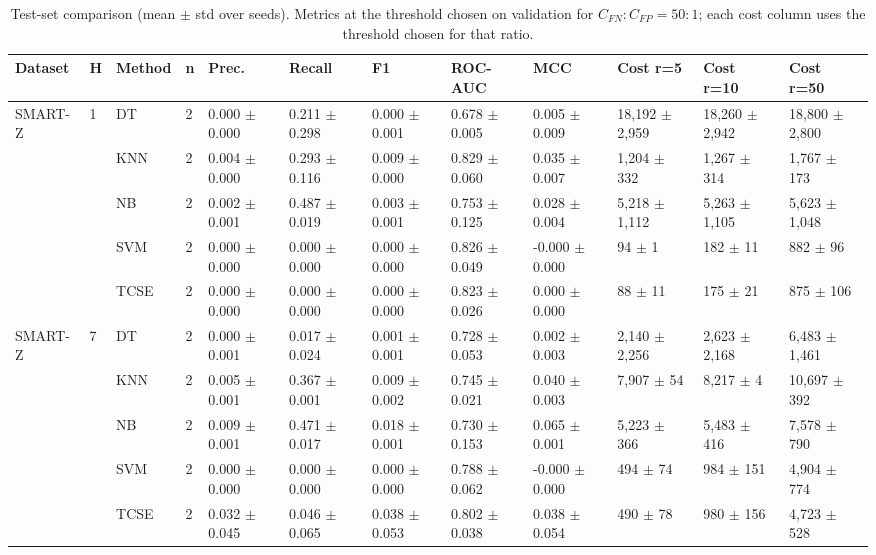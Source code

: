 \begin{table}[t]
\centering
\caption{Test-set comparison (mean $\pm$ std over seeds). Metrics at the threshold chosen on validation for $C_{FN}{:}C_{FP}=50{:}1$; each cost column uses the threshold chosen for that ratio.}
\label{tab:table1_main_comparison_r50}
\footnotesize
\begin{tabular}{llllllllllll}
\toprule
Dataset & H & Method & n & Prec. & Recall & F1 & ROC-AUC & MCC & Cost r=5 & Cost r=10 & Cost r=50 \\
\midrule
SMART-Z & 1 & DT & 2 & 0.000 $\pm$ 0.000 & 0.211 $\pm$ 0.298 & 0.000 $\pm$ 0.001 & 0.678 $\pm$ 0.005 & 0.005 $\pm$ 0.009 & 18,192 $\pm$ 2,959 & 18,260 $\pm$ 2,942 & 18,800 $\pm$ 2,800 \\
 &  & KNN & 2 & 0.004 $\pm$ 0.000 & 0.293 $\pm$ 0.116 & 0.009 $\pm$ 0.000 & 0.829 $\pm$ 0.060 & 0.035 $\pm$ 0.007 & 1,204 $\pm$ 332 & 1,267 $\pm$ 314 & 1,767 $\pm$ 173 \\
 &  & NB & 2 & 0.002 $\pm$ 0.001 & 0.487 $\pm$ 0.019 & 0.003 $\pm$ 0.001 & 0.753 $\pm$ 0.125 & 0.028 $\pm$ 0.004 & 5,218 $\pm$ 1,112 & 5,263 $\pm$ 1,105 & 5,623 $\pm$ 1,048 \\
 &  & SVM & 2 & 0.000 $\pm$ 0.000 & 0.000 $\pm$ 0.000 & 0.000 $\pm$ 0.000 & 0.826 $\pm$ 0.049 & -0.000 $\pm$ 0.000 & 94 $\pm$ 1 & 182 $\pm$ 11 & 882 $\pm$ 96 \\
 &  & TCSE & 2 & 0.000 $\pm$ 0.000 & 0.000 $\pm$ 0.000 & 0.000 $\pm$ 0.000 & 0.823 $\pm$ 0.026 & 0.000 $\pm$ 0.000 & 88 $\pm$ 11 & 175 $\pm$ 21 & 875 $\pm$ 106 \\
SMART-Z & 7 & DT & 2 & 0.000 $\pm$ 0.001 & 0.017 $\pm$ 0.024 & 0.001 $\pm$ 0.001 & 0.728 $\pm$ 0.053 & 0.002 $\pm$ 0.003 & 2,140 $\pm$ 2,256 & 2,623 $\pm$ 2,168 & 6,483 $\pm$ 1,461 \\
 &  & KNN & 2 & 0.005 $\pm$ 0.001 & 0.367 $\pm$ 0.001 & 0.009 $\pm$ 0.002 & 0.745 $\pm$ 0.021 & 0.040 $\pm$ 0.003 & 7,907 $\pm$ 54 & 8,217 $\pm$ 4 & 10,697 $\pm$ 392 \\
 &  & NB & 2 & 0.009 $\pm$ 0.001 & 0.471 $\pm$ 0.017 & 0.018 $\pm$ 0.001 & 0.730 $\pm$ 0.153 & 0.065 $\pm$ 0.001 & 5,223 $\pm$ 366 & 5,483 $\pm$ 416 & 7,578 $\pm$ 790 \\
 &  & SVM & 2 & 0.000 $\pm$ 0.000 & 0.000 $\pm$ 0.000 & 0.000 $\pm$ 0.000 & 0.788 $\pm$ 0.062 & -0.000 $\pm$ 0.000 & 494 $\pm$ 74 & 984 $\pm$ 151 & 4,904 $\pm$ 774 \\
 &  & TCSE & 2 & 0.032 $\pm$ 0.045 & 0.046 $\pm$ 0.065 & 0.038 $\pm$ 0.053 & 0.802 $\pm$ 0.038 & 0.038 $\pm$ 0.054 & 490 $\pm$ 78 & 980 $\pm$ 156 & 4,723 $\pm$ 528 \\

\end{tabular}
\end{table}
